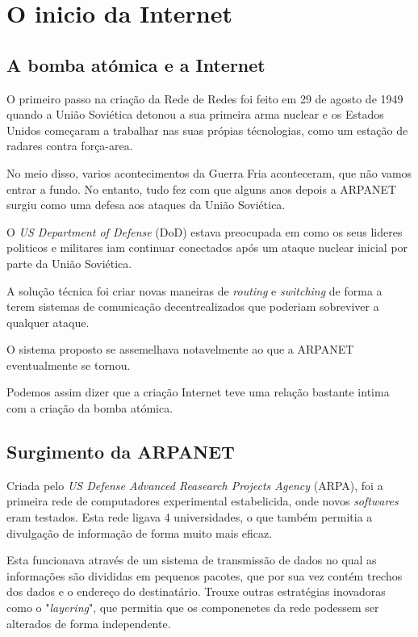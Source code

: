 \section{O inicio da Internet}
\label{sec:beggining}

\subsection{A bomba atómica e a Internet}
O primeiro passo na criação da Rede de Redes foi feito em 29 de agosto de 1949
quando a União Soviética detonou a sua primeira arma nuclear e os Estados Unidos
começaram a trabalhar nas suas própias técnologias, como um estação de radares
contra força-area. 

No meio disso, varios acontecimentos da Guerra Fria aconteceram, que não vamos
entrar a fundo. No entanto, tudo fez com que alguns anos depois
a ARPANET surgiu como uma defesa aos ataques da União Soviética.

O \textit{US Department of Defense} (DoD) estava preocupada em como 
os seus lideres politicos e militares iam continuar conectados após
um ataque nuclear inicial por parte da União Soviética.

A solução técnica foi criar novas maneiras de \textit{routing} e \textit{switching}
de forma a terem sistemas de comunicação decentrealizados que poderiam sobreviver 
a qualquer ataque.

O sistema proposto se assemelhava notavelmente ao que a ARPANET eventualmente
se tornou.

Podemos assim dizer que a criação Internet teve uma relação bastante
intima com a criação da bomba atómica.

\subsection{Surgimento da ARPANET}
Criada pelo \textit{US Defense Advanced Reasearch Projects Agency} (ARPA), foi a primeira
rede de computadores experimental estabelicida, onde novos \textit{softwares} 
eram testados. Esta rede ligava 4 universidades, o que também permitia 
a divulgação de informação de forma muito mais eficaz.

Esta funcionava através de um sistema de transmissão de dados no qual as informações
são divididas em pequenos pacotes, que por sua vez contém trechos dos dados e
o endereço do destinatário. Trouxe outras estratégias inovadoras como 
o "\textit{layering}", que permitia que os componenetes da rede podessem
ser alterados de forma independente.

